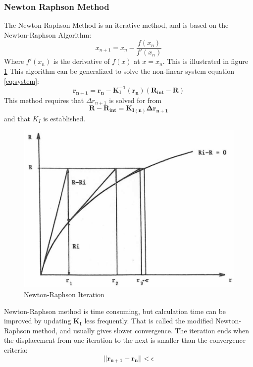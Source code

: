 \subsubsection{Newton Raphson Method}
\label{sec:newton}
The Newton-Raphson Method is an iterative method, and is based on the Newton-Raphson Algorithm:
\begin{equation}
    x_{n+1}=x_n - \frac{f(x_n)}{f'(x_n)}
\end{equation}
 Where $f'(x_n)$ is the derivative of $f(x)$ at $x=x_n$. This is illustrated in figure \ref{fig:newton}
 \noindent This algorithm can be generalized to solve the non-linear system equation \ref{eq:system}:
 \begin{equation}
  \boldsymbol{r_{n+1}}= \boldsymbol{r_n-K_I^{-1}(r_n)(R_{int}-R)} 
\end{equation}
This method requires that $\Delta r_{n+1}$ is solved for from 
\begin{equation}
   \boldsymbol{R-R_{int}}=\boldsymbol{K_{I(n)}\Delta r_{n+1}}
   \label{eq:newton}
\end{equation}
and that $K_I$ is established. 
 \begin{figure}[H]
\centering
\includegraphics[scale=0.5]{figures/newton2}
\caption[$\; \:$Newton-Raphson Iteration]{Newton-Raphson Iteration \cite{moan2003} }
 \label{fig:newton}
\end{figure}
\noindent Newton-Raphson method is time consuming, but calculation time can be improved by updating $\boldsymbol{K_I}$ less frequently. That is called the modified Newton-Raphson method, and usually gives slower convergence.  The iteration ends when the displacement from one iteration to the next is smaller than the convergence criteria:
\begin{equation}
    ||\boldsymbol{r_{n+1}-r_n||} < \epsilon
\end{equation}


